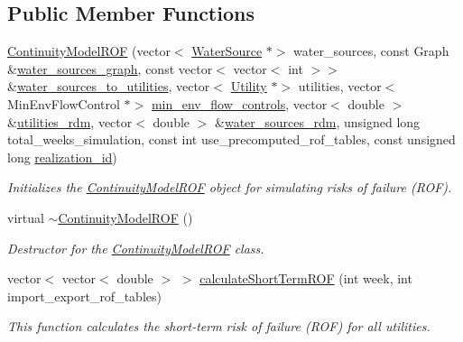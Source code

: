 \subsection*{Public Member Functions}
\begin{DoxyCompactItemize}
\item 
\mbox{\hyperlink{classContinuityModelROF_a23bd422349e4e2246bd44b2007564fd1}{Continuity\+Model\+R\+OF}} (vector$<$ \mbox{\hyperlink{classWaterSource}{Water\+Source}} $\ast$$>$ water\+\_\+sources, const Graph \&\mbox{\hyperlink{classContinuityModel_a563401588c6fa622f03393909a3522db}{water\+\_\+sources\+\_\+graph}}, const vector$<$ vector$<$ int $>$$>$ \&\mbox{\hyperlink{classContinuityModel_ae8516bcbbf52650190277fc8b06c1843}{water\+\_\+sources\+\_\+to\+\_\+utilities}}, vector$<$ \mbox{\hyperlink{classUtility}{Utility}} $\ast$$>$ utilities, vector$<$ Min\+Env\+Flow\+Control $\ast$$>$ \mbox{\hyperlink{classContinuityModel_afc991e5c0d144020e49a97751a04b302}{min\+\_\+env\+\_\+flow\+\_\+controls}}, vector$<$ double $>$ \&\mbox{\hyperlink{classContinuityModel_aa4a00b76da6295d2faa11e3dcaea1896}{utilities\+\_\+rdm}}, vector$<$ double $>$ \&\mbox{\hyperlink{classContinuityModel_ab7b8fa93a6f56b328e425e1ead6cfefa}{water\+\_\+sources\+\_\+rdm}}, unsigned long total\+\_\+weeks\+\_\+simulation, const int use\+\_\+precomputed\+\_\+rof\+\_\+tables, const unsigned long \mbox{\hyperlink{classContinuityModel_a7b6c99bf256f6c6b633ebb78282f43c7}{realization\+\_\+id}})
\begin{DoxyCompactList}\small\item\em Initializes the \mbox{\hyperlink{classContinuityModelROF}{Continuity\+Model\+R\+OF}} object for simulating risks of failure (R\+OF). \end{DoxyCompactList}\item 
virtual \mbox{\hyperlink{classContinuityModelROF_a4acab850e28a3a41182a19d86a7de709}{$\sim$\+Continuity\+Model\+R\+OF}} ()
\begin{DoxyCompactList}\small\item\em Destructor for the \mbox{\hyperlink{classContinuityModelROF}{Continuity\+Model\+R\+OF}} class. \end{DoxyCompactList}\item 
vector$<$ vector$<$ double $>$ $>$ \mbox{\hyperlink{classContinuityModelROF_a0386963b5914aaaa145de60a2ff1f84e}{calculate\+Short\+Term\+R\+OF}} (int week, int import\+\_\+export\+\_\+rof\+\_\+tables)
\begin{DoxyCompactList}\small\item\em This function calculates the short-\/term risk of failure (R\+OF) for all utilities. \end{DoxyCompactList}\item 

\end{DoxyCompactItemize}
